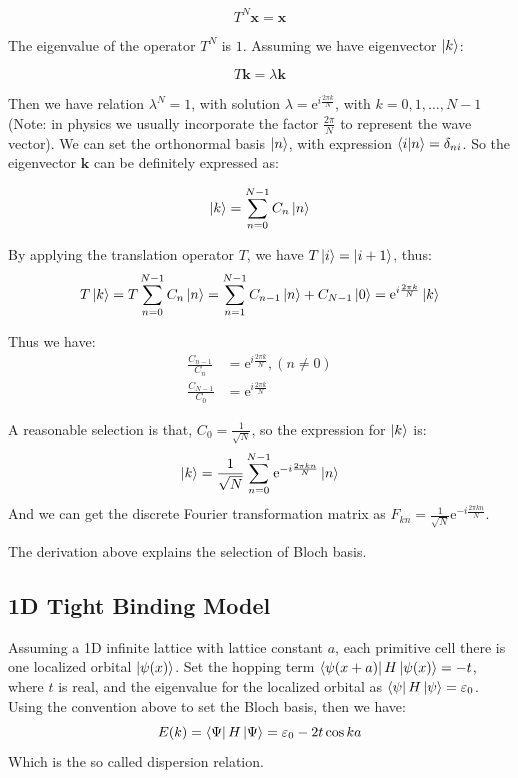 \documentclass[../main.tex]{subfiles}
\begin{document}
\begin{equation}
    T^N\bm{x} = \bm{x}
\end{equation} 

The eigenvalue of the operator $T^N$ is $1$. Assuming we have eigenvector $\ket{k}$:

\begin{equation}
    T\bm{k} = \lambda \bm{k}
\end{equation}

Then we have relation $\lambda^N = 1$, with solution $\lambda = \textrm{e}^{i\frac{2\pi k}{N}}$, with $k = 0, 1, \dots, N - 1$ (Note: in physics we usually incorporate the factor $\frac{2\pi}{N}$ to represent the wave vector). We can set the orthonormal basis $\ket{n}$, with expression $\braket{i}{n} = \delta_{ni}$. So the eigenvector $\bm{k}$ can be definitely expressed as:

\begin{equation}
    \ket{k} = \sum_{n=0}^{N-1} C_n \ket{n}
\end{equation}

By applying the translation operator $T$, we have $T\ket{i} = \ket{i+1}$, thus:
\begin{equation}
    T\ket{k} = T \sum_{n=0}^{N-1} C_n \ket{n} = \sum_{n=1}^{N-1} C_{n-1} \ket{n} + C_{N-1}\ket{0} = \textrm{e}^{i\frac{2\pi k}{N}} \ket{k}
\end{equation}

Thus we have:
\begin{align}
    \frac{C_{n-1}}{C_n} &= \textrm{e}^{i\frac{2\pi k}{N}}, (n \ne 0)\nonumber\\
    \frac{C_{N-1}}{C_0} &= \textrm{e}^{i\frac{2\pi k}{N}}
\end{align}

A reasonable selection is that, $C_0 = \frac{1}{\sqrt{N}}$, so the expression for $\ket{k}$ is:
\begin{equation}
    \ket{k} =  \frac{1}{\sqrt{N}}\sum_{n = 0}^{N-1} \textrm{e}^{-i\frac{2\pi kn}{N}}\ket{n}
\end{equation}
And we can get the discrete Fourier transformation matrix as $F_{kn} =  \frac{1}{\sqrt{N}}\textrm{e}^{-i\frac{2\pi kn}{N}}$.

The derivation above explains the selection of Bloch basis.

\subsection{1D Tight Binding Model}
Assuming a 1D infinite lattice with lattice constant $a$, each primitive cell there is one localized orbital $\ket{\psi(x)}$. Set the hopping term $\bra{\psi(x+a)}H\ket{\psi(x)} = -t$, where $t$ is real, and the eigenvalue for the localized orbital as $\bra{\psi}H\ket{\psi} = \varepsilon_0$. Using the convention above to set the Bloch basis, then we have:
\begin{equation}
    E(k) = \bra{\Psi}H\ket{\Psi} = \varepsilon_0 - 2t\cos ka
\end{equation}
Which is the so called dispersion relation.
\end{document}
